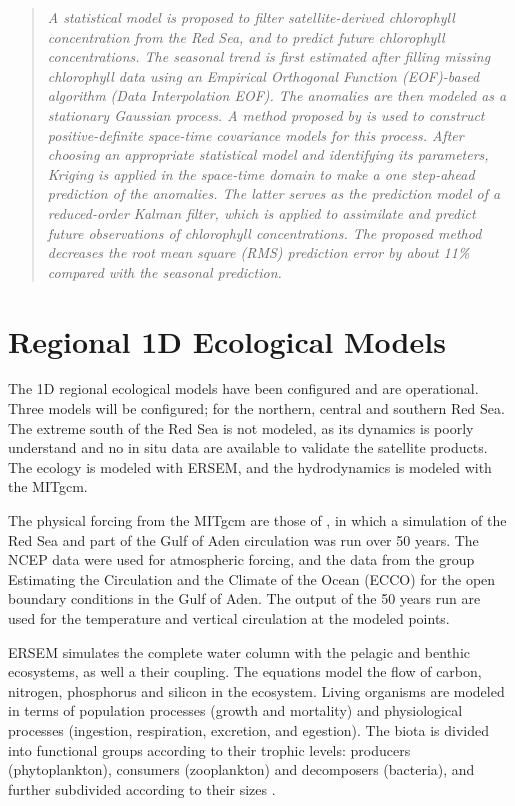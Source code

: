 \begin{quotation}
\emph{A statistical model is proposed to filter satellite-derived chlorophyll
concentration from the Red Sea, and to predict future chlorophyll
concentrations. The seasonal trend is first estimated after filling missing
chlorophyll data using an Empirical Orthogonal Function (EOF)-based algorithm
(Data Interpolation EOF). The anomalies are then modeled as a stationary
Gaussian process. A method proposed by \citet{Gneiting2002} is used to
construct positive-definite space-time covariance models for this process.
After choosing an appropriate statistical model and identifying its parameters,
Kriging is applied in the space-time domain to make a one step-ahead prediction
of the anomalies. The latter serves as the prediction model of a reduced-order
Kalman filter, which is applied to assimilate and predict future observations
of chlorophyll concentrations. The proposed method decreases the root mean
square (RMS) prediction error by about 11\% compared with the seasonal
prediction.}
\end{quotation}

\section{Regional 1D Ecological Models}

The 1D regional ecological models have been configured and
are operational. Three models will be configured; for the northern, central and
southern Red Sea. The extreme south of the Red Sea is not modeled, as its
dynamics is poorly understand and no in situ data are available to validate the
satellite products. The ecology is modeled with ERSEM, and the hydrodynamics
is modeled with the MITgcm.

The physical forcing from the MITgcm are those of \citet{Yao2014, Yao2014b}, in
which a simulation of the Red Sea and part of the Gulf of Aden circulation was
run over 50 years. The NCEP data were used for atmospheric forcing, and the
data from the group Estimating the Circulation and the Climate of the Ocean
(ECCO) for the open boundary conditions in the Gulf of Aden. The output of the
50 years run are used for the temperature and vertical circulation at the
modeled points.

ERSEM simulates the complete water column with the pelagic and benthic
ecosystems, as well a their coupling. The equations model the flow of carbon,
nitrogen, phosphorus and silicon in the ecosystem. Living organisms are modeled
in terms of population processes (growth and mortality) and physiological
processes (ingestion, respiration, excretion, and egestion). The biota is
divided into functional groups according to their trophic levels: producers
(phytoplankton), consumers (zooplankton) and decomposers (bacteria), and
further subdivided according to their sizes \citep{Baretta1995}.

